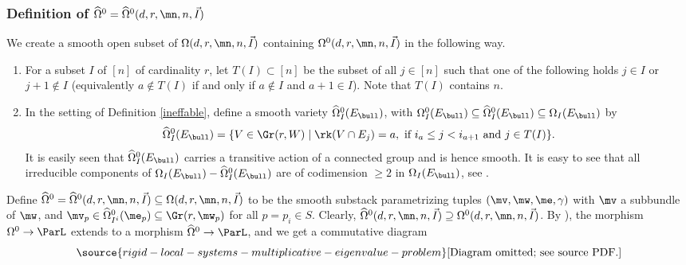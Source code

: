 \subsubsection{Definition of $\widehat{\Omega}^0=\widehat{\Omega}^0(d,r,\mn,n,\vec{I})$}\label{bruckner92}
We create a  smooth open subset of $\Omega(d,r,\mn,n,\vec{I})$ containing $\Omega^0(d,r,\mn,n,\vec{I})$ in the following way.

\begin{defi}
\notready\label{ToI}

\begin{enumerate}
\item For a subset $I$ of $[n]$ of cardinality $r$, let $T(I)\subset [n]$ be the subset of all $j\in [n]$ such that one of the following holds $j\in I$ or $j+1\not\in I$ (equivalently $a\not\in T(I)$ if and only if $a\not\in I$ and $a+1\in I$). Note that $T(I)$ contains $n$.
\item In the setting of Definition \ref{ineffable}, define a smooth variety $\widehat{\Omega}^0_I(E_{\bull})$, with $\Omega^0_I(E_{\bull})\subseteq \widehat{\Omega}^0_I(E_{\bull})\subseteq {\Omega}_I(E_{\bull})$ by
$$\widehat{\Omega}^0_I(E_{\bull})=\{V\in \Gr(r,W)\mid \rk (V\cap E_j)=a, \text{ if } i_a\leq j<i_{a+1}\text { and } j\in T(I)\}.$$
It is easily seen that  $\widehat{\Omega}^0_I(E_{\bull})$ carries a transitive action of a connected group and is hence smooth. It is easy to see that all irreducible components of
${\Omega}_I(E_{\bull})-\widehat{\Omega}^0_I(E_{\bull})$ are of codimension $\geq 2$ in ${\Omega}_I(E_{\bull})$, see \cite[Lemma 7.9]{BHermit}.
\end{enumerate}
\end{defi}
Define $\widehat{\Omega}^0=\widehat{\Omega}^0(d,r,\mn,n,\vec{I})\subseteq \Omega(d,r,\mn,n,\vec{I})$ to be the smooth substack parametrizing tuples $(\mv,\mw,\me,\gamma)$ with $\mv$ a subbundle of $\mw$, and $\mv_p\in \widehat{\Omega}^0_{I^i}(\me_p)\subseteq \Gr(r,\mw_p)$ for all $p=p_i\in S$. Clearly, $\widehat{\Omega}^0(d,r,\mn,n,\vec{I})\supseteq {\Omega}^0(d,r,\mn,n,\vec{I})$.
By \cite[Lemma 7.10]{BHermit}), the morphism  $\Omega^0 \to \ParL$ extends to a morphism $\widehat{\Omega}^0\to\ParL$, and we get a commutative diagram
 \begin{equation}\label{morph1}
\source{rigid-local-systems-multiplicative-eigenvalue-problem}
\text{[Diagram omitted; see source PDF.]}
\end{equation}

